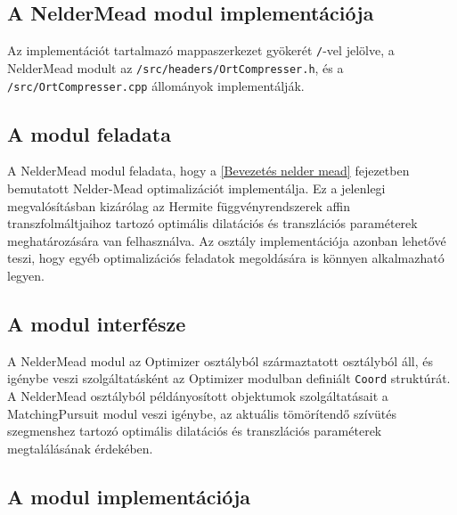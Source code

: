 \documentclass[oneside,titlepage,12pt,a4paper]{report}
\begin{document}
\subsection{A NelderMead modul implementációja}

Az implementációt tartalmazó mappaszerkezet gyökerét \texttt{/}-vel jelölve, a NelderMead modult  az \texttt{/src/headers/OrtCompresser.h}, és a \texttt{/src/OrtCompresser.cpp} állományok implementálják.

\subsection*{A modul feladata}

\par A NelderMead modul feladata, hogy a \ref{Bevezetés nelder mead} fejezetben bemutatott Nelder-Mead optimalizációt implementálja. Ez a jelenlegi megvalósításban kizárólag az Hermite függvényrendszerek affin transzfolmáltjaihoz tartozó optimális dilatációs és transzlációs paraméterek meghatározására van felhasználva. Az osztály implementációja azonban lehetővé teszi, hogy egyéb optimalizációs feladatok megoldására is könnyen alkalmazható legyen.

\subsection*{A modul interfésze}

\par A NelderMead modul az Optimizer osztályból származtatott osztályból áll, és igénybe veszi szolgáltatásként az Optimizer modulban definiált \texttt{Coord} struktúrát. A NelderMead osztályból példányosított objektumok szolgáltatásait a MatchingPursuit modul veszi igénybe, az aktuális tömörítendő szívütés szegmenshez tartozó optimális dilatációs és transzlációs paraméterek megtalálásának érdekében.

\subsection*{A modul implementációja}
\end{document}
